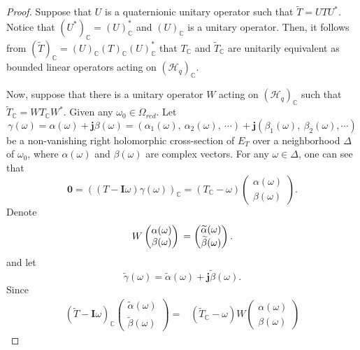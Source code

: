 \documentclass[10pt,a4paper]{amsart}
\begin{document}
    \begin{proof}
    Suppose that $U$ is a quaternionic unitary operator such that
    $\widetilde{T}=UTU^*$. Notice that $(U^*)_{\mathbb{C}}=(U)_{\mathbb{C}}^*$ and $(U)_{\mathbb{C}}$ is a unitary operator. Then, it follows from $(\widetilde{T})_{\mathbb{C}}=(U)_{\mathbb{C}}(T)_{\mathbb{C}}(U)_{\mathbb{C}}^*$  that $T_{\mathbb{C}}$ and $\widetilde{T}_{\mathbb{C}}$ are unitarily equivalent as bounded linear operators acting on $({\mathcal{H}_q})_\mathbb{C}$.


    Now, suppose that there is a unitary operator $W$ acting on $({\mathcal{H}_q})_\mathbb{C}$ such that $\widetilde{T}_{\mathbb{C}}=WT_{\mathbb{C}}W^*$. Given any $\omega_0\in\Omega_{red}$. Let
    $$
    \gamma(\omega)=\alpha(\omega)+\boldsymbol{j}\beta(\omega)=
    (\alpha_{1}(\omega),\ \alpha_{2}(\omega),\ \cdots)+\boldsymbol{j}(\beta_{1}(\omega),\ \beta_{2}(\omega),\cdots)
    $$
    be a non-vanishing right holomorphic cross-section of $E_T$ over a neighborhood $\Delta$ of $\omega_0$, where $\alpha(\omega)$ and $\beta(\omega)$ are complex vectors. For any $\omega\in\Delta$, one can see that
    $$
    \boldsymbol{0}=((T-\boldsymbol{I}\omega)\gamma(\omega))_{\mathbb{C}}=(T_{\mathbb{C}}-\omega)
    \begin{pmatrix}
    	\alpha(\omega) \\
    	\beta(\omega)
    	\end{pmatrix}.
    $$
    Denote
    $$
    W
    \begin{pmatrix}
    	\alpha(\omega) \\
    	\beta(\omega)
    \end{pmatrix} \\
    =\begin{pmatrix}
    	\widetilde{\alpha}(\omega) \\
    	\widetilde{\beta}(\omega)
    \end{pmatrix}.
$$
and let
    $$
    \widetilde{\gamma}(\omega)=\widetilde{\alpha}(\omega)+\boldsymbol{j}\widetilde{\beta}(\omega).
    $$
   Since
    $$\begin{aligned}
    (\widetilde{T}-\boldsymbol{I}\omega)_{\mathbb{C}}
    \begin{pmatrix}
    \widetilde{\alpha}(\omega) \\
    \widetilde{\beta}(\omega)
    \end{pmatrix}
    = & (\widetilde{T}_{{\mathbb{C}}}-\omega)W
    \begin{pmatrix}
    \alpha(\omega) \\
    \beta(\omega)

\end{pmatrix}
\end{aligned}$$
\end{proof}
\end{document}
